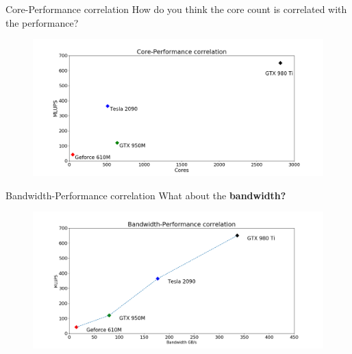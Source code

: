 \documentclass[9pt]{beamer}
\begin{document}
\begin{frame}{Core-Performance correlation}
How do you think the core count is correlated with the performance? 
\pause 

\begin{figure}
\begin{center}
	\includegraphics[scale=0.25]{images/core_mlups.png}
\end{center}
\end{figure}
\end{frame}

\begin{frame}{Bandwidth-Performance correlation}
What about the \textbf{bandwidth?} \\
\pause
\begin{figure}
\begin{center}
	\includegraphics[scale=0.25]{images/bandwidth_mlups_corr.png}
\end{center}
\end{figure}
\end{frame}
\end{document}
